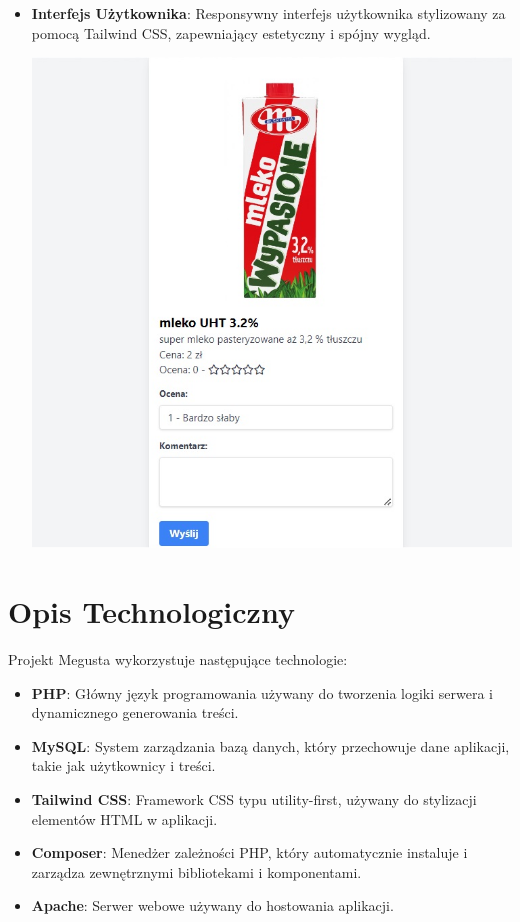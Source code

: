 \documentclass[a4paper,12pt]{report}
\begin{document}
\begin{itemize}
\newpage  
    
    \item \textbf{Interfejs Użytkownika}: Responsywny interfejs użytkownika stylizowany za pomocą Tailwind CSS, zapewniający estetyczny i spójny wygląd.

    \includegraphics[width=\textwidth]{04paneluzytkownika.jpg}

    
\end{itemize}

\chapter{Opis Technologiczny}
Projekt Megusta wykorzystuje następujące technologie:
\begin{itemize}
    \item \textbf{PHP}: Główny język programowania używany do tworzenia logiki serwera i dynamicznego generowania treści.
    \item \textbf{MySQL}: System zarządzania bazą danych, który przechowuje dane aplikacji, takie jak użytkownicy i treści.
    \item \textbf{Tailwind CSS}: Framework CSS typu utility-first, używany do stylizacji elementów HTML w aplikacji.
    \item \textbf{Composer}: Menedżer zależności PHP, który automatycznie instaluje i zarządza zewnętrznymi bibliotekami i komponentami.
    \item \textbf{Apache}: Serwer webowe używany do hostowania aplikacji.
\end{itemize}
\end{document}
